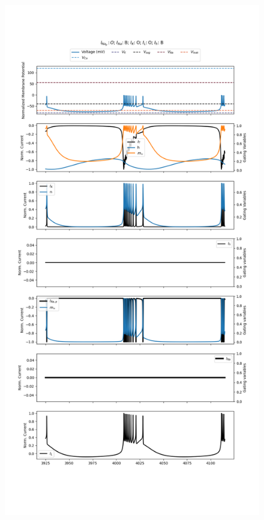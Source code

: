 \documentclass[../../workflow.tex]{subfiles}
\begin{document}
\begin{figure}[H]
    \centering
    \includegraphics[height=\textheight]{img/r5/wang1994/experiment_9.png}
\end{figure}
\end{document}
